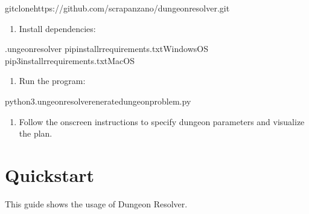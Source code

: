 \documentclass[letterpaper,10pt,english]{sphinxmanual}
\begin{document}
\begin{sphinxVerbatim}[commandchars=\\\{\}]
gitclonehttps://github.com/scrapanzano/dungeon\PYGZus{}resolver.git
\end{sphinxVerbatim}
\begin{enumerate}
%
\setcounter{enumi}{1}
\item {} 
\sphinxAtStartPar
Install dependencies:

\end{enumerate}

\begin{sphinxVerbatim}[commandchars=\\\{\}]
.ungeon\PYGZus{}resolver
pipinstall\PYGZhy{}rrequirements.txt\PYG{o}{[}WindowsOS\PYG{o}{]}
pip3install\PYGZhy{}rrequirements.txt\PYG{o}{[}MacOS\PYG{o}{]}
\end{sphinxVerbatim}
\begin{enumerate}
%
\setcounter{enumi}{2}
\item {} 
\sphinxAtStartPar
Run the program:

\end{enumerate}

\begin{sphinxVerbatim}[commandchars=\\\{\}]
python3.ungeon\PYGZus{}resolverenerate\PYGZus{}dungeon\PYGZus{}problem.py
\end{sphinxVerbatim}
\begin{enumerate}
%
\setcounter{enumi}{3}
\item {} 
\sphinxAtStartPar
Follow the on\sphinxhyphen{}screen instructions to specify dungeon parameters and visualize the plan.

\end{enumerate}

\sphinxstepscope


\section{Quickstart}
\label{\detokenize{getting_started/quickstart:quickstart}}\label{\detokenize{getting_started/quickstart::doc}}
\sphinxAtStartPar
This guide shows the usage of Dungeon Resolver.
\end{document}
